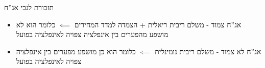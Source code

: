 \documentclass[usenames,dvipsnames]{beamer}
\begin{document}
\begin{RTL}
\begin{frame}[allowframebreaks]
    \framebreak

    \begin{block}{תזכורת לגבי אג''ח}
        \begin{itemize}
        \item  אג''ח צמוד - משלם ריבית ריאלית + הצמדה למדד המחירים $\impliedby$ כלומר הוא לא מושפע מהפערים בין אינפלציה צפויה לאינפלציה בפועל
        \item אג''ח לא צמוד - משלם ריבית נומינלית $\impliedby$ כלומר הוא כן מושפע מפערים בין אינפלציה צפויה לאינפלציה בפועל
        \end{itemize}
        
    \end{block}

\end{frame}
\end{RTL}
\end{document}
